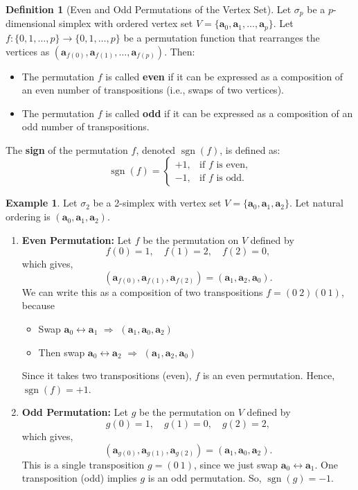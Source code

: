 \documentclass[12pt,oneside,reqno]{amsart}
\theoremstyle{plain}
\theoremstyle{definition}
\newtheorem{example}{Example}[section]
\newtheorem{definition}[theorem]{Definition}
\theoremstyle{remark}
\newcommand{\0}{{\textbf{0}}}
\begin{document}
\begin{definition}[Even and Odd Permutations of the Vertex Set]\label{d:Even and Odd Permutations of the Vertex Set}
Let $\sigma_p$ be a $p$-dimensional simplex with ordered vertex set $V = \{\mathbf{a}_0, \mathbf{a}_1, \ldots, \mathbf{a}_p\}$.
Let $f \colon \{0, 1, \ldots, p\} \to \{0, 1, \ldots, p\}$ be a permutation function that rearranges the vertices as  $(\mathbf{a}_{f(0)}, \mathbf{a}_{f(1)}, \ldots, \mathbf{a}_{f(p)})$. Then:
\begin{itemize}
\item The permutation $f$ is called \textbf{even} if it can be expressed as a composition of an even number of transpositions (i.e., swaps of two vertices).
\item The permutation $f$ is called \textbf{odd} if it can be expressed as a composition of an odd number of transpositions.
\end{itemize}

The \textbf{sign} of the permutation $f$, denoted $\operatorname{sgn}(f)$, is defined as:
\[
\operatorname{sgn}(f) =
\begin{cases}
+1, & \text{if } f \text{ is even,} \\
-1, & \text{if } f \text{ is odd.}
\end{cases}
\]
\end{definition}

\begin{example}\label{eg:Even and Odd Permutations on a 2-Simplex}
Let $\sigma_2$ be a 2-simplex with vertex set $V = \{\mathbf{a}_0, \mathbf{a}_1, \mathbf{a}_2\}$. Let natural ordering is $(\mathbf{a}_0, \mathbf{a}_1, \mathbf{a}_2)$.

\begin{enumerate}
\item \textbf{Even Permutation:} Let $f$ be the permutation on $V$ defined by 
\[
f(0) = 1, \quad f(1) = 2, \quad f(2) = 0,
\]
which gives,
\[
(\mathbf{a}_{f(0)}, \mathbf{a}_{f(1)}, \mathbf{a}_{f(2)}) = (\mathbf{a}_1, \mathbf{a}_2, \mathbf{a}_0).
\]
We can write this as a composition of two transpositions $f = (0\ 2)(0\ 1)$, because
\begin{itemize}
    \item Swap $\mathbf{a}_0 \leftrightarrow \mathbf{a}_1$ $\Rightarrow$ $(\mathbf{a}_1, \mathbf{a}_0, \mathbf{a}_2)$
    \item Then swap $\mathbf{a}_0 \leftrightarrow \mathbf{a}_2$ $\Rightarrow$ $(\mathbf{a}_1, \mathbf{a}_2, \mathbf{a}_0)$
\end{itemize}
Since it takes two transpositions (even), $f$ is an even permutation. 
Hence, $\operatorname{sgn}(f) = +1$.
\item \textbf{Odd Permutation:} Let $g$ be the permutation on $V$ defined by 
\[
g(0) = 1, \quad g(1) = 0, \quad g(2) = 2,
\]
which gives,
\[
(\mathbf{a}_{g(0)}, \mathbf{a}_{g(1)}, \mathbf{a}_{g(2)}) = (\mathbf{a}_1, \mathbf{a}_0, \mathbf{a}_2).
\]
This is a single transposition $g = (0\ 1)$, since we just swap $\mathbf{a}_0 \leftrightarrow \mathbf{a}_1$. One transposition (odd) implies $g$ is an odd permutation. So, $\operatorname{sgn}(g) = -1$.
\end{enumerate}
\end{example}
\end{document}
